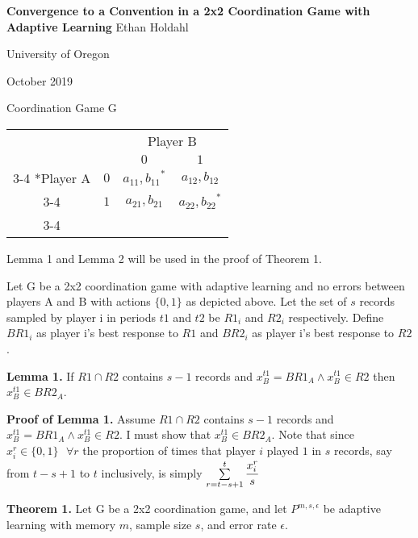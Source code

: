 \documentclass{article}
\begin{document}
\centering
\Large
\textbf{Convergence to a Convention in a 2x2 Coordination Game with Adaptive Learning}
\vskip0pt
Ethan Holdahl

\large
University of Oregon

October 2019

\vskip24pt

\centering
Coordination Game G
\vskip6pt
    \begin{tabular}{cc|c|c|}
      & \multicolumn{1}{c}{} & \multicolumn{2}{c}{Player B}\\
      & \multicolumn{1}{c}{} & \multicolumn{1}{c}{$0$}  & \multicolumn{1}{c}{$1$} \\\cline{3-4}
      \multirow{2}*{Player A}  & $0$ & ${a_{11},b_{11}}^*$ & $a_{12},b_{12}$ \\\cline{3-4}
      & $1$ & $a_{21},b_{21}$ & ${a_{22},b_{22}}^*$ \\\cline{3-4}
    \end{tabular}

\vskip24pt

\raggedright

Lemma 1 and Lemma 2 will be used in the proof of Theorem 1.

\vskip12pt

Let G be a 2x2 coordination game with adaptive learning and no errors between players A and B with actions $\{0,1\}$ as depicted above. Let the set of $s$ records sampled by player i in periods $t1$ and $t2$ be $R1_i$ and $R2_i$ respectively. Define $BR1_i$ as player i's best response to $R1$ and $BR2_i$ as player i's best response to $R2$.

\vskip12pt

\textbf{Lemma 1.} If $R1 \cap R2$ contains $s-1$ records and $x_B^{t1}=BR1_A \wedge x_B^{t1} \in R2$ then $x_B^{t1} \in BR2_A$.

\vskip12pt

\textbf{Proof of Lemma 1.} Assume $R1 \cap R2$ contains $s-1$ records and $x_B^{t1}=BR1_A \wedge x_B^{t1} \in R2$. I must show that $x_B^{t1} \in BR2_A$.
Note that since $x_i^r \in \{0,1\} \hspace{8pt} \forall r$ the proportion of times that player $i$ played $1$ in $s$ records, say from $t-s+1$ to $t$ inclusively, is simply $\sum\limits_{r=t-s+1}^{t} \cfrac{x_i^r}{s}$

\vskip12pt

\textbf{Theorem 1.} Let G be a 2x2 coordination game, and let $P^{m,s,\epsilon}$ be adaptive learning with memory $m$, sample size $s$, and error rate $\epsilon$.
\end{document}
